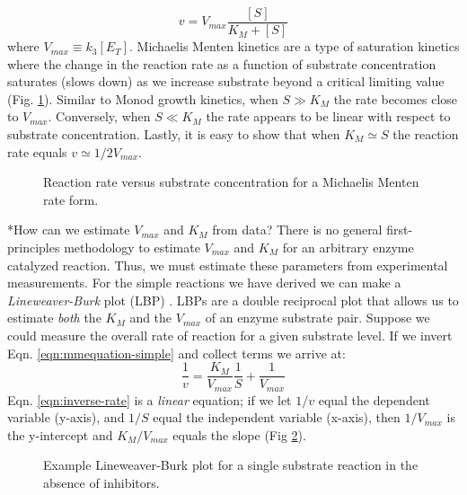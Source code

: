 \documentclass[11pt]{article}
\makeatletter
\theoremstyle{definition}
\renewcommand\subsection{\@startsection
	{subsection}{2}{0mm}
	{-0.05in}
	{-0.5\baselineskip}
	{\normalfont\normalsize\bfseries}}
\makeatother
\begin{document}
\begin{equation}\label{eqn:mmequation-simple}
	v = V_{max}\frac{\left[S\right]}{K_{M}+\left[S\right]}
\end{equation}where $V_{max}\equiv{k_{3}}\left[E_{T}\right]$. Michaelis Menten kinetics are a type of saturation kinetics where the change in the reaction rate as a function of substrate concentration
saturates (slows down) as we increase substrate beyond a critical limiting value (Fig. \ref{fig-mm-plot}).  Similar to Monod growth kinetics, when $S\gg{K}_{M}$ the rate becomes close to $V_{max}$. Conversely,
when $S\ll{K}_{M}$ the rate appears to be linear with respect to substrate concentration.
Lastly, it is easy to show that when $K_{M}\simeq S$ the reaction rate equals $v\simeq 1/2V_{max}$.

\begin{figure}[!h]\centering
{}
\caption{Reaction rate versus substrate concentration for a Michaelis Menten rate form. }\label{fig-mm-plot}
\end{figure}

\subsection*{How can we estimate $V_{max}$ and $K_{M}$ from data?}
There is no general first-principles methodology to estimate $V_{max}$ and $K_{M}$ for an arbitrary enzyme catalyzed reaction.
Thus, we must estimate these parameters from experimental measurements.
For the simple reactions we have derived we can make a \emph{Lineweaver-Burk} plot (LBP) \citep{LWBPlot}.
LBPs are a double reciprocal plot that allows us to estimate \emph{both} the $K_{M}$ and the $V_{max}$ of
an enzyme substrate pair.
Suppose we could measure the overall rate of reaction for a given substrate level.
If we invert Eqn. \eqref{eqn:mmequation-simple} and collect terms we arrive at:
\begin{equation}\label{eqn:inverse-rate}
	\frac{1}{v} = \frac{K_{M}}{V_{max}}\frac{1}{S} + \frac{1}{V_{max}}
\end{equation}Eqn. \eqref{eqn:inverse-rate} is a \emph{linear} equation; if we let $1/v$ equal the dependent variable (y-axis), and $1/S$ equal the independent variable (x-axis),
then $1/V_{max}$ is the y-intercept and
$K_{M}/V_{max}$ equals the slope (Fig \ref{fig-lwb-plot}).
\begin{figure}[!h]\centering
{}
\caption{Example Lineweaver-Burk plot for a single substrate reaction in the absence of inhibitors.}\label{fig-lwb-plot}
\end{figure}
\end{document}
